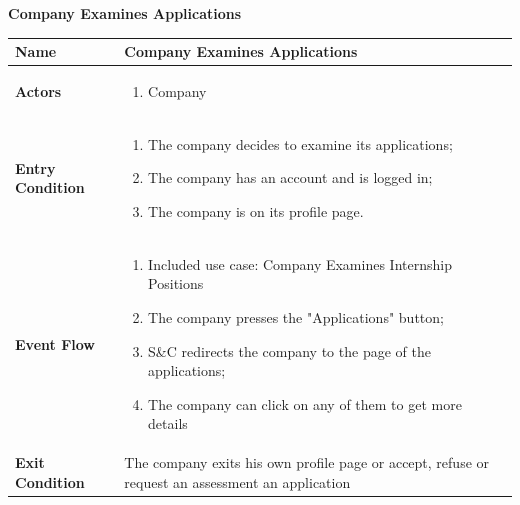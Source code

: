 \begin{enumerate}[label=\textbf{[US\arabic*]}, left = 0pt, align = left, resume]
            \newpage
            \item \textbf{Company Examines Applications} 
            
            \begin{longtable}{|l|p{11cm}|}  
                \hline
                \textbf{Name} & 
                    \textbf{Company Examines Applications} \\
                \hline
                
                \textbf{Actors} & 
                    \begin{enumerate}[label=\textbullet, itemsep=0em]
                        \item Company
                    \end{enumerate} \\
                \hline
                
                \textbf{Entry Condition} & 
                    \begin{enumerate}[label=\textbullet, itemsep=0em]
                        \item The company decides to examine its applications;
                        \item The company has an account and is logged in;
                        \item The company is on its profile page.
                    \end{enumerate} \\
                \hline
                
                \textbf{Event Flow} &
                    \begin{enumerate}[label=\arabic*., itemsep=0.2em]
                        \item Included use case: Company Examines Internship Positions 
                        \item The company presses the "Applications" button;
                        \item S\&C redirects the company to the page of the applications;
                        \item The company can click on any of them to get more details
                    \end{enumerate} \\
                \hline
                
                \textbf{Exit Condition} & 
                    The company exits his own profile page or accept, refuse or request an assessment an application\\
                \hline
                

\end{longtable}
\end{enumerate}
